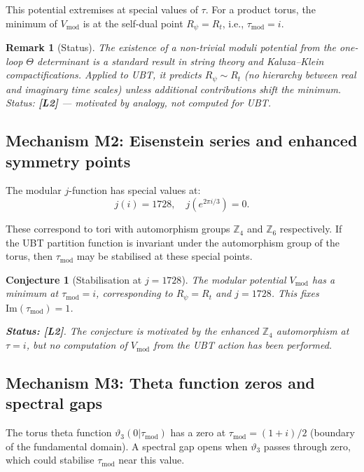 \documentclass[11pt,a4paper]{article}
\newtheorem{remark}{Remark}
\newtheorem{conjecture}{Conjecture}
\begin{document}
This potential extremises at special values of $\tau$.  For a product torus,
the minimum of $V_{\mathrm{mod}}$ is at the self-dual point $R_\psi = R_t$,
i.e., $\tau_{\mathrm{mod}} = i$.

\begin{remark}[Status]
  The existence of a non-trivial moduli potential from the one-loop $\Theta$
  determinant is a standard result in string theory and Kaluza--Klein
  compactifications.  Applied to UBT, it predicts $R_\psi \sim R_t$
  (no hierarchy between real and imaginary time scales) unless additional
  contributions shift the minimum.  Status: \textbf{[L2]} — motivated by
  analogy, not computed for UBT.
\end{remark}

\subsection{Mechanism M2: Eisenstein series and enhanced symmetry points}

The modular $j$-function has special values at:
\begin{equation}
  j(i) = 1728, \quad j(e^{2\pi i/3}) = 0.
\end{equation}

These correspond to tori with automorphism groups $\mathbb{Z}_4$ and
$\mathbb{Z}_6$ respectively.  If the UBT partition function is invariant
under the automorphism group of the torus, then $\tau_{\mathrm{mod}}$
may be stabilised at these special points.

\begin{conjecture}[Stabilisation at $j = 1728$]\label{conj:j1728}
  The modular potential $V_{\mathrm{mod}}$ has a minimum at $\tau_{\mathrm{mod}} = i$,
  corresponding to $R_\psi = R_t$ and $j = 1728$.  This fixes
  $\mathrm{Im}(\tau_{\mathrm{mod}}) = 1$.

  \textbf{Status: [L2]}.  The conjecture is motivated by the enhanced
  $\mathbb{Z}_4$ automorphism at $\tau = i$, but no computation of
  $V_{\mathrm{mod}}$ from the UBT action has been performed.
\end{conjecture}

\subsection{Mechanism M3: Theta function zeros and spectral gaps}

The torus theta function $\vartheta_3(0|\tau_{\mathrm{mod}})$ has a zero
at $\tau_{\mathrm{mod}} = (1 + i)/2$ (boundary of the fundamental domain).
A spectral gap opens when $\vartheta_3$ passes through zero, which could
stabilise $\tau_{\mathrm{mod}}$ near this value.
\end{document}
